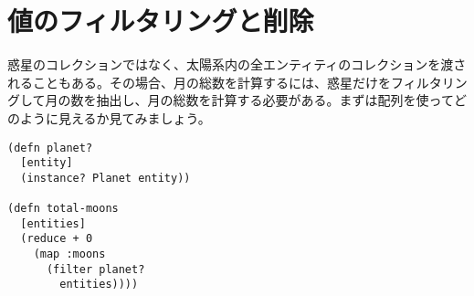 \section{値のフィルタリングと削除}

惑星のコレクションではなく、太陽系内の全エンティティのコレクションを渡されることもある。その場合、月の総数を計算するには、惑星だけをフィルタリングして月の数を抽出し、月の総数を計算する必要がある。まずは配列を使ってどのように見えるか見てみましょう。


\begin{lstlisting}[numbers=none]
(defn planet?
  [entity]
  (instance? Planet entity))

(defn total-moons
  [entities]
  (reduce + 0
    (map :moons
      (filter planet?
        entities))))
\end{lstlisting}





